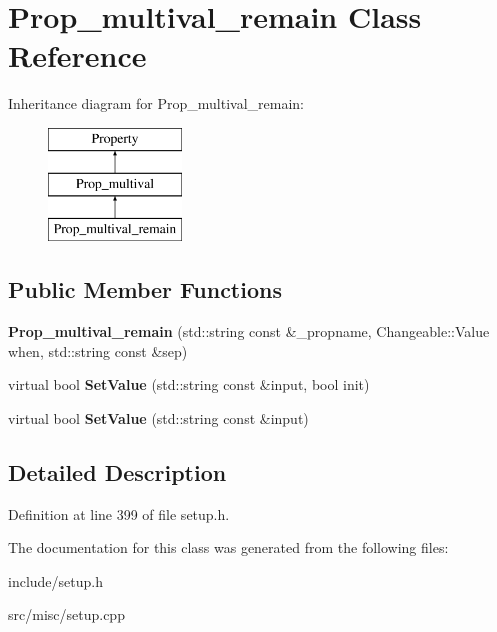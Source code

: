 \hypertarget{classProp__multival__remain}{\section{Prop\-\_\-multival\-\_\-remain Class Reference}
\label{classProp__multival__remain}
}
Inheritance diagram for Prop\-\_\-multival\-\_\-remain\-:\begin{figure}[H]
\begin{center}
\leavevmode
\includegraphics[height=3.000000cm]{classProp__multival__remain}
\end{center}
\end{figure}
\subsection*{Public Member Functions}
\begin{DoxyCompactItemize}
\item 
\hypertarget{classProp__multival__remain_a59450ef7be09d83d29831c5c378d79ad}{{\bfseries Prop\-\_\-multival\-\_\-remain} (std\-::string const \&\-\_\-propname, Changeable\-::\-Value when, std\-::string const \&sep)}\label{classProp__multival__remain_a59450ef7be09d83d29831c5c378d79ad}

\item 
\hypertarget{classProp__multival__remain_a73ff08a986693c879b330654de3152cc}{virtual bool {\bfseries Set\-Value} (std\-::string const \&input, bool init)}\label{classProp__multival__remain_a73ff08a986693c879b330654de3152cc}

\item 
\hypertarget{classProp__multival__remain_ac6f943a59a58acf45efe4c0ee51f3948}{virtual bool {\bfseries Set\-Value} (std\-::string const \&input)}\label{classProp__multival__remain_ac6f943a59a58acf45efe4c0ee51f3948}

\end{DoxyCompactItemize}


\subsection{Detailed Description}


Definition at line 399 of file setup.\-h.



The documentation for this class was generated from the following files\-:\begin{DoxyCompactItemize}
\item 
include/setup.\-h\item 
src/misc/setup.\-cpp\end{DoxyCompactItemize}
